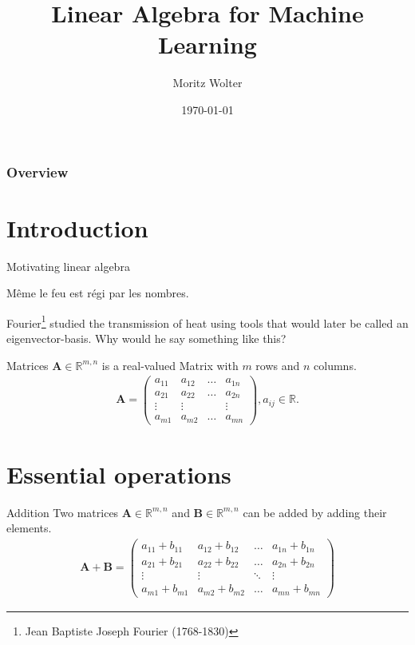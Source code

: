 \documentclass[notes]{beamer}
\title{Linear Algebra for Machine Learning}
\date{\today}
\institute{High-Performance Computing and Analytics Lab, University of Bonn}
\author{Moritz Wolter}
\begin{document}
    \maketitle

    \begin{frame}
    \frametitle{Overview} 
    \tableofcontents
    \end{frame}

    \section{Introduction}
    \begin{frame}{Motivating linear algebra}
      \begin{displayquote}
        Même le feu est régi par les nombres.
      \end{displayquote}
      Fourier\footnote{Jean Baptiste Joseph Fourier (1768-1830)} studied the transmission of heat using tools that would later be called
      an eigenvector-basis.
      Why would he say something like this?
    \end{frame}

    \begin{frame}{Matrices}
      $\mathbf{A} \in \mathbb{R}^{m,n}$ is a real-valued Matrix with $m$ rows and $n$ columns.
      \begin{align}
        \mathbf{A} = \begin{pmatrix}
          a_{11} & a_{12} & \dots & a_{1n} \\
          a_{21} & a_{22} & \dots & a_{2n} \\
          \vdots & \vdots &       & \vdots \\
          a_{m1} & a_{m2} & \dots & a_{mn}
        \end{pmatrix}
      , a_{ij} \in \mathbb{R}.
      \end{align}
     \end{frame}


    \section{Essential operations}
    \begin{frame}{Addition}
      Two matrices $\mathbf{A} \in \mathbb{R}^{m,n}$ and $\mathbf{B} \in \mathbb{R}^{m,n}$ can be added by adding their elements.
      \begin{align}
        \mathbf{A} + \mathbf{B} =
        \begin{pmatrix}
            a_{11} + b_{11} & a_{12} + b_{12} & \dots & a_{1n} + b_{1n} \\
            a_{21} + b_{21} & a_{22} + b_{22} & \dots & a_{2n} + b_{2n} \\
            \vdots          & \vdots          & \ddots & \vdots         \\
            a_{m1} + b_{m1} & a_{m2} + b_{m2} & \dots & a_{mn} + b_{mn}
          \end{pmatrix}
        \end{align}
    \end{frame}
\end{document}
